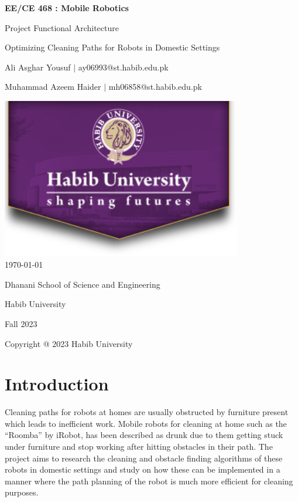 \documentclass[12pt]{article}
\begin{document}
\begin{titlepage}
    \centering
    {\LARGE\textbf{EE/CE 468 : Mobile Robotics}\par}
    \vspace{0.5cm}
    {\Large Project Functional Architecture\par}
    \vspace{0.2cm}
    {\Large Optimizing Cleaning Paths for Robots in Domestic Settings\par}
    \vspace*{\fill} %
    {\large Ali Asghar Yousuf $\mid$ ay06993@st.habib.edu.pk\par}
    {\large Muhammad Azeem Haider $\mid$ mh06858@st.habib.edu.pk\par}
    \vspace{2cm}
    \includegraphics[height=7cm]{../HU_logo}\\\bigskip
    {\large \today}\\\bigskip\bigskip
    \vspace{1cm}
    \vspace{2cm}
    {\large Dhanani School of Science and Engineering\par}
    {\large Habib University\par}
    {\large Fall 2023\par}
    \vspace*{\fill} %
    {\large Copyright @ 2023 Habib University\par}
\end{titlepage}

\thispagestyle{empty} %
\tableofcontents
\clearpage

\section{Introduction}
Cleaning paths for robots at homes are usually obstructed by furniture present
which leads to inefficient work. Mobile robots for cleaning at home such as the
``Roomba'' by iRobot, has been described as drunk due to them getting stuck
under furniture and stop working after hitting obstacles in their path. The
project aims to research the cleaning and obstacle finding algorithms of these
robots in domestic settings and study on how these can be implemented in a
manner where the path planning of the robot is much more efficient for cleaning
purposes.
\end{document}
